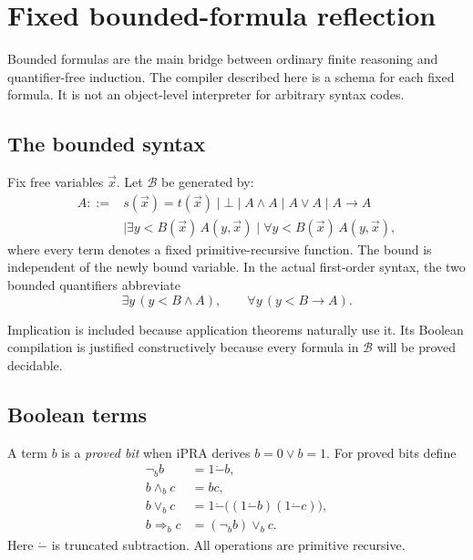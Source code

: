 \section{Fixed bounded-formula reflection}
\label{sec:bounded-reflection}

Bounded formulas are the main bridge between ordinary finite reasoning and quantifier-free induction.  The compiler described here is a schema for each fixed formula.  It is not an object-level interpreter for arbitrary syntax codes.

\subsection{The bounded syntax}

Fix free variables \(\vec x\).  Let \(\mathcal B\) be generated by:
\[
\begin{aligned}
A ::= {}& s(\vec x)=t(\vec x) \mid \bot \mid A\wedge A \mid A\vee A
\mid A\to A \\
&\mid \exists y<B(\vec x)\,A(y,\vec x)
\mid \forall y<B(\vec x)\,A(y,\vec x),
\end{aligned}
\]
where every term denotes a fixed primitive-recursive function.  The bound is independent of the newly bound variable.  In the actual first-order syntax, the two bounded quantifiers abbreviate
\[
\exists y\,(y<B\wedge A),
\qquad
\forall y\,(y<B\to A).
\]

Implication is included because application theorems naturally use it.  Its Boolean compilation is justified constructively because every formula in \(\mathcal B\) will be proved decidable.

\subsection{Boolean terms}

A term \(b\) is a \emph{proved bit} when iPRA derives \(b=0\vee b=1\).  For proved bits define
\[
\begin{aligned}
\neg_b b &= 1\mathbin{\dot-}b,\\
b\wedge_b c &= bc,\\
b\vee_b c &= 1\mathbin{\dot-}\bigl((1\mathbin{\dot-}b)(1\mathbin{\dot-}c)\bigr),\\
b\Rightarrow_b c &= (\neg_b b)\vee_b c.
\end{aligned}
\]
Here \(\dot-\) is truncated subtraction.  All operations are primitive recursive.

